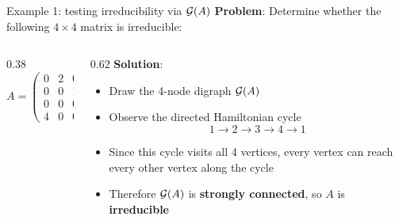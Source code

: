 \documentclass[aspectratio=169]{beamer}\usepackage[]{graphicx}\usepackage[]{xcolor}
\begin{document}
\begin{frame}{Example 1: testing irreducibility via $\mathcal{G}(A)$}
\textbf{Problem}: Determine whether the following $4 \times 4$ matrix is irreducible:
\vfill
\begin{columns}[c]
\begin{column}{0.38\textwidth}
\[
A = \begin{pmatrix}
0 & 2 & 0 & 0 \\
0 & 0 & 1 & 3 \\
0 & 0 & 0 & 1 \\
4 & 0 & 0 & 0
\end{pmatrix}
\]
\vspace{0.2cm}
\centering
{}
\end{column}
\begin{column}{0.62\textwidth}
\textbf{Solution}:
\begin{itemize}
\item Draw the 4-node digraph $\mathcal{G}(A)$
\item Observe the directed Hamiltonian cycle
\[
1 \to 2 \to 3 \to 4 \to 1
\]
\item Since this cycle visits all 4 vertices, every vertex can reach every other vertex along the cycle
\item Therefore $\mathcal{G}(A)$ is \textbf{strongly connected}, so $A$ is \textbf{irreducible}
\end{itemize}
\end{column}
\end{columns}
\end{frame}
\end{document}
